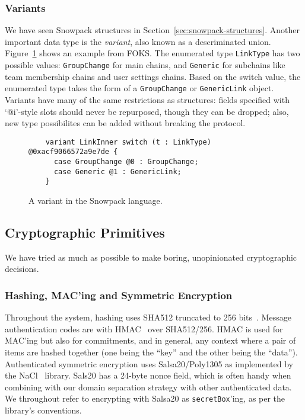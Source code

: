 \subsubsection{Variants}

We have seen Snowpack structures in Section~\ref{sec:snowpack-structures}. Another important
data type is the \textit{variant}, also known as a descriminated union. Figure~\ref{fig:link-inner}
shows an example from FOKS. The enumerated type \texttt{LinkType} has two possible values:
\texttt{GroupChange} for main chains, and \texttt{Generic} for subchains like team membership chains
and user settings chains. Based on the switch value, the enumerated type takes the form of 
a \texttt{GroupChange} or \texttt{GenericLink} object. Variants have many of the same restrictions
as structures: fields specified with `@i'-style slots should never be repurposed, though they 
can be dropped; also, new type possibilites can be added without breaking the protocol.

\begin{figure}[ht]
  \centering
  \begin{verbatim}
    variant LinkInner switch (t : LinkType) @0xacf9066572a9e7de {
      case GroupChange @0 : GroupChange;
      case Generic @1 : GenericLink;
    }\end{verbatim}
  \caption{A variant in the Snowpack language.}
  \label{fig:link-inner}
\end{figure}

\subsection{Cryptographic Primitives}
\label{sec:cryptography}

We have tried as much as possible to make boring, unopinionated cryptographic
decisions.

\subsubsection{Hashing, MAC'ing and Symmetric Encryption}

Throughout the system, hashing uses SHA512 truncated to 256 bits~\cite{rfc6234}.
Message authentication codes are with HMAC~\cite{rfc2104} over SHA512/256. HMAC
is used for MAC'ing but also for commitments, and in general, any context where
a pair of items are hashed together (one being the ``key'' and the other being
the ``data''). Authenticated symmetric encryption uses Salsa20/Poly1305 as
implemented by the NaCl~\cite{nacl} library. Sals20 has a 24-byte nonce field,
which is often handy when combining with our domain separation strategy with
other authenticated data. We throughout refer to encrypting with Salsa20 as
\texttt{secretBox}'ing, as per the library's conventions.

